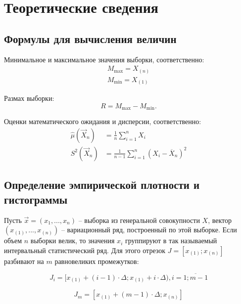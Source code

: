 \chapter{Теоретические сведения}

\section{Формулы для вычисления величин}

Минимальное и максимальное значения выборки, соответственно:
\begin{equation}
    \begin{aligned}
        M_{\max} = X_{(n)}\\
        M_{\min} = X_{(1)}
    \end{aligned}
\end{equation}

Размах выборки:
\begin{equation}
    R = M_{\max} - M_{\min}.
\end{equation}

Оценки математического ожидания и дисперсии, соответственно:
\begin{equation}
    \begin{aligned}
    \hat\mu(\vec X_n) &= \frac 1n \sum_{i=1}^n X_i\\
    S^2(\vec X_n) &= \frac 1{n-1} \sum_{i=1}^n (X_i-\overline X_n)^2
    \end{aligned}
\end{equation}

\section{Определение эмпирической плотности и гистограммы}

Пусть $\vec x=(x_1, ..., x_n)$ -- выборка из генеральной совокупности $X$, вектор $(x_{(1)}, ..., x_{(n)})$ -- вариационный ряд, построенный по этой выборке.  Если объем $n$ выборки велик, то значения $x_i$ группируют в так называемый интервальный статистический ряд. Для этого отрезок $J = [x_{(1)}; x_{(n)}]$ разбивают на $m$ равновеликих промежутков:

\begin{equation*}
    J_i = [x_{(1)} + (i - 1) \cdot \Delta; x_{(1)} + i \cdot \Delta), i = \overline{1; m - 1}
\end{equation*}

\begin{equation*}
    J_{m} = [x_{(1)} + (m - 1) \cdot \Delta; x_{(n)}]
\end{equation*}

